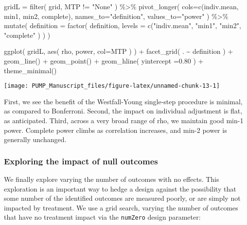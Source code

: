 \documentclass[
]{article}
\newenvironment{Shaded}{\begin{snugshade}}{\end{snugshade}}
\newcommand{\AttributeTok}[1]{\textcolor[rgb]{0.77,0.63,0.00}{#1}}
\newcommand{\FloatTok}[1]{\textcolor[rgb]{0.00,0.00,0.81}{#1}}
\newcommand{\FunctionTok}[1]{\textcolor[rgb]{0.00,0.00,0.00}{#1}}
\newcommand{\NormalTok}[1]{#1}
\newcommand{\OtherTok}[1]{\textcolor[rgb]{0.56,0.35,0.01}{#1}}
\newcommand{\SpecialCharTok}[1]{\textcolor[rgb]{0.00,0.00,0.00}{#1}}
\newcommand{\StringTok}[1]{\textcolor[rgb]{0.31,0.60,0.02}{#1}}
\begin{document}
\begin{Shaded}
\begin{Highlighting}[]
\NormalTok{gridL }\OtherTok{=} \FunctionTok{filter}\NormalTok{( grid, MTP }\SpecialCharTok{!=} \StringTok{"None"}\NormalTok{ ) }\SpecialCharTok{\%\textgreater{}\%}
  \FunctionTok{pivot\_longer}\NormalTok{( }\AttributeTok{cols=}\FunctionTok{c}\NormalTok{(indiv.mean, min1, min2, complete),}
                \AttributeTok{names\_to=}\StringTok{"definition"}\NormalTok{, }\AttributeTok{values\_to=}\StringTok{"power"}\NormalTok{ ) }\SpecialCharTok{\%\textgreater{}\%}
  \FunctionTok{mutate}\NormalTok{( }\AttributeTok{definition =} \FunctionTok{factor}\NormalTok{( definition,}
                            \AttributeTok{levels =} \FunctionTok{c}\NormalTok{(}\StringTok{"indiv.mean"}\NormalTok{, }\StringTok{"min1"}\NormalTok{, }\StringTok{"min2"}\NormalTok{, }\StringTok{"complete"}\NormalTok{ ) ) )}

\FunctionTok{ggplot}\NormalTok{( gridL, }\FunctionTok{aes}\NormalTok{( rho, power, }\AttributeTok{col=}\NormalTok{MTP ) ) }\SpecialCharTok{+}
  \FunctionTok{facet\_grid}\NormalTok{( . }\SpecialCharTok{\textasciitilde{}}\NormalTok{ definition ) }\SpecialCharTok{+}
  \FunctionTok{geom\_line}\NormalTok{() }\SpecialCharTok{+} \FunctionTok{geom\_point}\NormalTok{() }\SpecialCharTok{+}
  \FunctionTok{geom\_hline}\NormalTok{( }\AttributeTok{yintercept =}\FloatTok{0.80}\NormalTok{ ) }\SpecialCharTok{+} \FunctionTok{theme\_minimal}\NormalTok{()}
\end{Highlighting}
\end{Shaded}

\begin{center}\texttt{[image: PUMP\_Manuscript\_files/figure-latex/unnamed-chunk-13-1]} \end{center}

First, we see the benefit of the Westfall-Young single-step procedure is
minimal, as compared to Bonferroni. Second, the impact on individual
adjustment is flat, as anticipated. Third, across a very broad range of
rho, we maintain good min-1 power. Complete power climbs as correlation
increases, and min-2 power is generally unchanged.

\subsubsection{Exploring the impact of null outcomes}

We finally explore varying the number of outcomes with no effects. This
exploration is an important way to hedge a design against the
possibility that some number of the identified outcomes are measured
poorly, or are simply not impacted by treatment. We use a grid search,
varying the number of outcomes that have no treatment impact via the
\texttt{numZero} design parameter:
\end{document}
